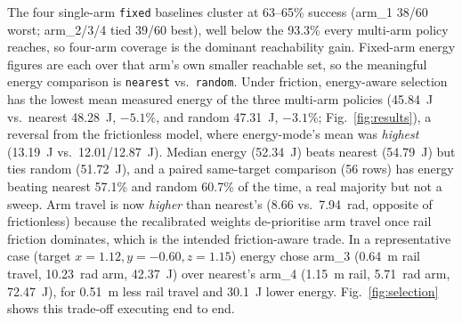 \documentclass[conference]{IEEEtran}
\begin{document}
\begin{table}[htbp]
\caption{Selection-policy comparison under the rail-friction model.}
\begin{center}
\label{tab:e3}
\end{center}
\end{table}

The four single-arm \texttt{fixed} baselines cluster at 63--65\%
success (arm\_1 38/60 worst; arm\_2/3/4 tied 39/60 best), well below the 93.3\%
every multi-arm policy reaches, so four-arm coverage is the dominant reachability
gain. Fixed-arm energy figures are each
over that arm's own smaller reachable set, so the meaningful energy comparison is
\texttt{nearest} vs.\ \texttt{random}. Under friction, energy-aware
selection has the lowest mean measured energy of the three multi-arm policies
(45.84~J vs.\ nearest 48.28~J, $-5.1\%$, and random 47.31~J, $-3.1\%$;
Fig.~\ref{fig:results}), a
reversal from the frictionless model, where energy-mode's mean was
\emph{highest} (13.19~J vs.\ 12.01/12.87~J). Median
energy (52.34~J) beats nearest (54.79~J) but ties random (51.72~J), and a paired
same-target comparison (56 rows) has energy beating nearest 57.1\% and random
60.7\% of the time, a real majority but not a sweep. Arm travel is now
\emph{higher} than nearest's (8.66 vs.\ 7.94~rad, opposite of frictionless)
because the recalibrated weights de-prioritise arm travel once rail friction
dominates, which is the intended friction-aware trade. In a representative case (target
$x{=}1.12,y{=}-0.60,z{=}1.15$) energy chose arm\_3 (0.64~m rail travel, 10.23~rad
arm, 42.37~J) over nearest's arm\_4 (1.15~m rail, 5.71~rad arm, 72.47~J), for
0.51~m less rail travel and 30.1~J lower energy. Fig.~\ref{fig:selection} shows
this trade-off executing end to end.
\end{document}
